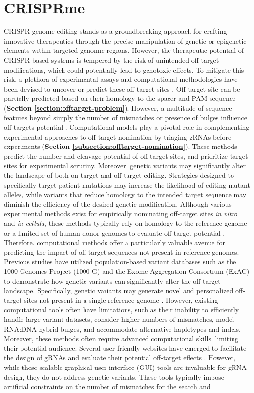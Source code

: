 \documentclass[a4paper, titlepage, openright]{book}
\newcommand{\mychapter}[2]{
    \setcounter{chapter}{#1}
    \setcounter{section}{0}
    \chapter*{#2}
    \addcontentsline{toc}{chapter}{#2}
}
\begin{document}
\mychapter{9}{CRISPRme}
CRISPR genome editing stands as a groundbreaking approach for crafting innovative therapeutics through the precise manipulation of genetic or epigenetic elements within targeted genomic regions. However, the therapeutic potential of CRISPR-based systems is tempered by the risk of unintended off-target modifications, which could potentially lead to genotoxic effects. To mitigate this risk, a plethora of experimental assays and computational methodologies have been devised to uncover or predict these off-target sites \citep{clement2020technologies}. Off-target site can be partially predicted based on their homology to the spacer and PAM sequence (\textbf{Section \ref{section:offtarget-problem}}). However, a multitude of sequence features beyond simply the number of mismatches or presence of bulges influence off-targets potential \citep{clement2020technologies, bao2021tools, hsu2013dna, doench2016optimized}. Computational models play a pivotal role in complementing experimental approaches to off-target nomination by triaging gRNAs before experiments (\textbf{Section \ref{subsection:offtarget-nomination}}). These methods predict the number and cleavage potential of off-target sites, and prioritize target sites for experimental scrutiny. Moreover, genetic variants may significantly alter the landscape of both on-target and off-target editing. Strategies designed to specifically target patient mutations may increase the likelihood of editing mutant alleles, while variants that reduce homology to the intended target sequence may diminish the efficiency of the desired genetic modification. Although various experimental methods exist for empirically nominating off-target sites \emph{in vitro} and \emph{in cellula}, these methods typically rely on homology to the reference genome or a limited set of human donor genomes to evaluate off-target potential \citep{bao2021tools, chaudhari2020evaluation}. Therefore, computational methods offer a particularly valuable avenue for predicting the impact of off-target sequences not present in reference genomes. Previous studies have utilized population-based variant databases such as the 1000 Genomes Project (1000 G) and the Exome Aggregation Consortium (ExAC) to demonstrate how genetic variants can significantly alter the off-target landscape. Specifically, genetic variants may generate novel and personalized off-target sites not present in a single reference genome \citep{lessard2017human, scott2017implications}. However, existing computational tools often have limitations, such as their inability to efficiently handle large variant datasets, consider higher numbers of mismatches, model RNA:DNA hybrid bulges, and accommodate alternative haplotypes and indels. Moreover, these methods often require advanced computational skills, limiting their potential audience. Several user-friendly websites have emerged to facilitate the design of gRNAs and evaluate their potential off-target effects \citep{concordet2018crispor, listgarten2018prediction, labun2019chopchop, park2015cas}. However, while these scalable graphical user interface (GUI) tools are invaluable for gRNA design, they do not address genetic variants. These tools typically impose artificial constraints on the number of mismatches for the search and 
\end{document}
